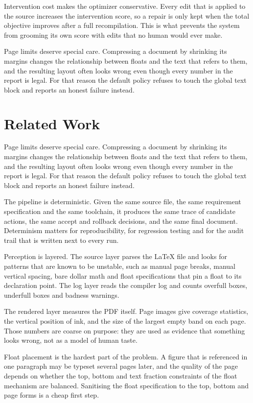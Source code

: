 \documentclass[10pt,a4paper]{article}
\begin{document}
Intervention cost makes the optimizer conservative. Every edit that is applied to the source increases the intervention score, so a repair is only kept when the total objective improves after a full recompilation. This is what prevents the system from grooming its own score with edits that no human would ever make.

Page limits deserve special care. Compressing a document by shrinking its margins changes the relationship between floats and the text that refers to them, and the resulting layout often looks wrong even though every number in the report is legal. For that reason the default policy refuses to touch the global text block and reports an honest failure instead.


\section{Related Work}
Page limits deserve special care. Compressing a document by shrinking its margins changes the relationship between floats and the text that refers to them, and the resulting layout often looks wrong even though every number in the report is legal. For that reason the default policy refuses to touch the global text block and reports an honest failure instead.

The pipeline is deterministic. Given the same source file, the same requirement specification and the same toolchain, it produces the same trace of candidate actions, the same accept and rollback decisions, and the same final document. Determinism matters for reproducibility, for regression testing and for the audit trail that is written next to every run.

Perception is layered. The source layer parses the LaTeX file and looks for patterns that are known to be unstable, such as manual page breaks, manual vertical spacing, bare dollar math and float specifications that pin a float to its declaration point. The log layer reads the compiler log and counts overfull boxes, underfull boxes and badness warnings.

The rendered layer measures the PDF itself. Page images give coverage statistics, the vertical position of ink, and the size of the largest empty band on each page. Those numbers are coarse on purpose: they are used as evidence that something looks wrong, not as a model of human taste.

Float placement is the hardest part of the problem. A figure that is referenced in one paragraph may be typeset several pages later, and the quality of the page depends on whether the top, bottom and text fraction constraints of the float mechanism are balanced. Sanitising the float specification to the top, bottom and page forms is a cheap first step.
\end{document}
